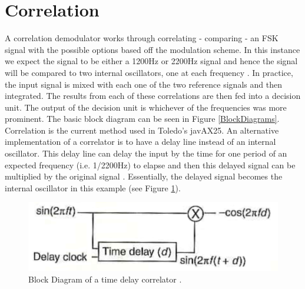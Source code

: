 \section{Correlation}
A correlation demodulator works through correlating - comparing - an FSK signal with the possible options based off the modulation scheme. In this instance we expect the signal to be either a 1200Hz or 2200Hz signal and hence the signal will be compared to two internal oscillators, one at each frequency \cite{Rowe2014}. In practice, the input signal is mixed with each one of the two reference signals and then integrated. The results from each of these correlations are then fed into a decision unit. The output of the decision unit is whichever of the frequencies was more prominent. The basic block diagram can be seen in Figure \ref{BlockDiagrams}. Correlation is the current method used in Toledo's javAX25. An alternative implementation of a correlator is to have a delay line instead of an internal oscillator. This delay line can delay the input by the time for one period of an expected frequency (i.e. 1/2200Hz) to elapse and then this delayed signal can be multiplied by the original signal \cite{Seguine2006}. Essentially, the delayed signal becomes the internal oscillator in this example (see Figure \ref{TimeDelayCorrelator}). 

\begin{figure}
  \centering
	\includegraphics[width=0.75\linewidth]{images/TimeDelayCorrelator.png} 
	\caption{Block Diagram of a time delay correlator \cite{Seguine2006}.}
   \label{TimeDelayCorrelator}
\end{figure}

